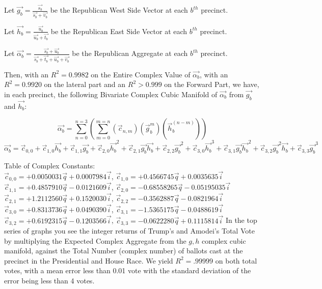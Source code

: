 Let $\vec{g_{b}}=\frac{\vec{s_{b}}}{\vec{s_{b}}+\vec{v_{b}}}$ be the Republican West Side Vector at each $b^{th}$ precinct.

Let $\vec{h_{b}}=\frac{\vec{u_{b}}}{\vec{u_{b}}+\vec{t_{b}}}$ be the Republican East Side Vector at each $b^{th}$ precinct.

Let $\vec{\alpha_{b}}=\frac{\vec{s_{b}}+\vec{u_{b}}}{\vec{s_{b}}+\vec{t_{b}}+\vec{u_{b}}+\vec{v_{b}}}$ be the Republican Aggregate at each $b^{th}$ precinct.

Then, with an $R^2=0.9982$ on the Entire Complex Value of $\vec{\alpha_{b}}$, with an $R^2=0.9920$ on the lateral part and an $R^2>0.999$ on the Forward Part, we have, in each precinct, the following Bivariate Complex Cubic Manifold of $\vec{\alpha_{b}}$ from $\vec{g_{b}}$ and $\vec{h_{b}}$:

$$\vec{\alpha_{b}}=\sum_{n=0}^{n=3}\left(\sum_{m=0}^{m=n}\left(\vec{c}_{n,m}\right)\left(\vec{g}_{b}^m\right)\left(\vec{h}_{b}^{(n-m)}\right) \right)$$
$$\vec{\alpha_{b}}=\vec{c}_{0,0}+\vec{c}_{1,0}\vec{h_{b}}+\vec{c}_{1,1}\vec{g_{b}}+\vec{c}_{2,0}\vec{h_{b}}^2+\vec{c}_{2,1}\vec{g_{b}}\vec{h_{b}}+\vec{c}_{2,2}\vec{g_{b}}^2+\vec{c}_{3,0}\vec{h_{b}}^3+\vec{c}_{3,1}\vec{g_{b}}\vec{h_{b}}^2+\vec{c}_{3,2}\vec{g_{b}}^2\vec{h_{b}}+\vec{c}_{3,3}\vec{g_{b}}^3$$

Table of Complex Constants:\\
$\vec{c}_{0,0}=+0.0050031\vec{q}+0.0007984\vec{i}$, $\vec{c}_{1,0}=+0.4566745\vec{q}+0.0035635\vec{i}$\\
$\vec{c}_{1,1}=+0.4857910\vec{q}-0.0121609\vec{i}$, $\vec{c}_{2,0}=-0.68558265\vec{q}-0.05195035\vec{i}$\\
$\vec{c}_{2,1}=+1.2112560\vec{q}+0.1520030\vec{i}$, $\vec{c}_{2,2}=-0.3562887\vec{q}-0.0821964\vec{i}$\\
$\vec{c}_{3,0}=+0.8313736\vec{q}+0.0490390\vec{i}$, $\vec{c}_{3,1}=-1.5365175\vec{q}-0.0488619\vec{i}$\\
$\vec{c}_{3,2}=+0.6192315\vec{q}-0.1203566\vec{i}$, $\vec{c}_{3,3}=-0.0622280\vec{q}+0.1115814\vec{i}$
\newpage
In the top series of graphs you see the integer returns of Trump's and Amodei's Total Vote by multiplying the Expected Complex Aggregate from the $g,h$ complex cubic manifold, against the Total Number (complex number) of ballots cast at the precinct in the Presidential and House Race. We yield $R^2=.99999$ on both total votes, with a mean error less than 0.01 vote with the standard deviation of the error being less than 4 votes. 

